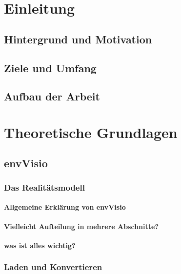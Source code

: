 \documentclass[a4paper, 12pt, oneside, BCOR=1cm,toc=chapterentrywithdots]{scrbook}
\begin{document}
\tableofcontents

\begingroup
\cleardoublepage
{}
\listoffigures

\let\clearpage\relax

\cleardoublepage
{}
\listoftables
\endgroup

\twocolumn
{}

\onecolumn

\chapter{Einleitung}

\section{Hintergrund und Motivation}
\section{Ziele und Umfang}
\section{Aufbau der Arbeit}

\chapter{Theoretische Grundlagen}

\section{envVisio}
\subsection{Das Realitätsmodell}
\subsubsection{Allgemeine Erklärung von envVisio}
\subsubsection{Vielleicht Aufteilung in mehrere Abschnitte?}
\subsubsection{was ist alles wichtig?}
\subsection{Laden und Konvertieren}
\end{document}
